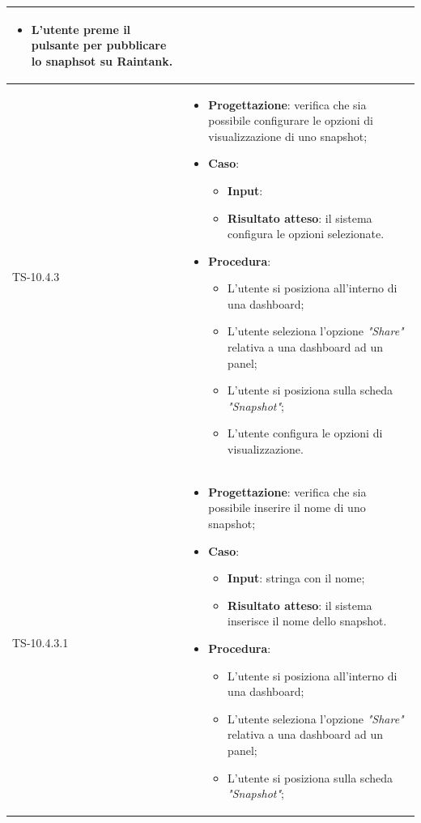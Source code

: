 \begin{longtable}{|C{2.5cm}|C{13cm}|}
\begin{itemize}
\begin{itemize}
		\item L'utente preme il pulsante per pubblicare lo snaphsot su Raintank.
	\end{itemize} 
\end{itemize}
	 \\
	\hline
	{TS-10.4.3} & 
\begin{itemize}
	\item \textbf{Progettazione}: verifica che sia possibile configurare le
	opzioni di visualizzazione di uno snapshot;
	\item \textbf{Caso}: 
	\begin{itemize}
		\item \textbf{Input}: 
		\item \textbf{Risultato atteso}: il sistema configura le opzioni selezionate.
	\end{itemize}
	\item \textbf{Procedura}:
	\begin{itemize}
		\item L'utente si posiziona all'interno di una dashboard;
		\item L'utente seleziona l'opzione \emph{"Share"} relativa a una dashboard ad un panel;
		\item L'utente si posiziona sulla scheda \emph{"Snapshot"};
		\item L'utente configura le opzioni di visualizzazione.
	\end{itemize} 
\end{itemize}
	\\
	\hline
	{TS-10.4.3.1} &
\begin{itemize}
	\item \textbf{Progettazione}: verifica che sia possibile inserire il nome
	di uno snapshot;
	\item \textbf{Caso}: 
	\begin{itemize}
		\item \textbf{Input}: stringa con il nome;
		\item \textbf{Risultato atteso}: il sistema inserisce il nome dello snapshot.
	\end{itemize}
	\item \textbf{Procedura}:
	\begin{itemize}
		\item L'utente si posiziona all'interno di una dashboard;
		\item L'utente seleziona l'opzione \emph{"Share"} relativa a una dashboard ad un panel;
		\item L'utente si posiziona sulla scheda \emph{"Snapshot"};

\end{itemize}
\end{itemize}
\end{longtable}
